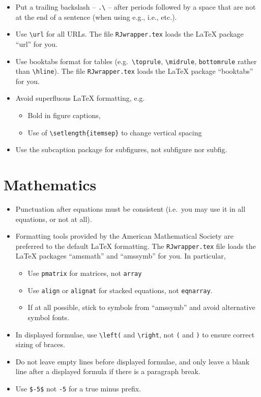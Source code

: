 \documentclass[11pt]{article}
\begin{document}
\begin{itemize}
\item Put a trailing backslash -- \verb+.\+ -- after periods followed
  by a space that are not at the end of a sentence (when using e.g.,
  i.e., etc.).
\item Use \verb+\url+ for all URLs. The file \texttt{RJwrapper.tex} 
  loads the LaTeX package ``url'' for you.
\item Use booktabs format for tables (e.g.\ \verb+\toprule+, 
  \verb+\midrule+, \verb+bottomrule+ rather than \verb+\hline+).
  The file \texttt{RJwrapper.tex} loads the LaTeX package ``booktabs''
  for you.
\item Avoid superfluous LaTeX formatting, e.g.
  \begin{itemize}
  \item Bold in figure captions,
  \item Use of \verb+\setlength{itemsep}+ to change vertical spacing
  \end{itemize}
\item Use the subcaption package for subfigures, not subfigure nor
  subfig.
\end{itemize}

\section*{Mathematics}

\begin{itemize}
\item Punctuation after equations must be consistent (i.e.\ you may
  use it in all equations, or not at all).
\item Formatting tools provided by the American Mathematical Society
  are preferred to the default LaTeX formatting. The
  \texttt{RJwrapper.tex} file loads the LaTeX packages ``amsmath'' and
  ``amssymb'' for you. In particular,
  \begin{itemize}
  \item Use \verb+pmatrix+ for matrices, not \verb+array+
  \item Use \verb+align+ or \verb+alignat+ for stacked equations,
    not \verb+eqnarray+.
  \item If at all possible, stick to symbols from ``amssymb'' and
    avoid alternative symbol fonts.
  \end{itemize}
\item In displayed formulae, use \verb+\left(+ and \verb+\right+, not
  \verb+(+ and \verb+)+ to ensure correct sizing of braces.
\item Do not leave empty lines before displayed formulae, and only
  leave a blank line after a displayed formula if there is a paragraph
  break.
\item Use \verb+$-5$+ not \verb+-5+ for a true minus prefix.
\end{itemize}
\end{document}
